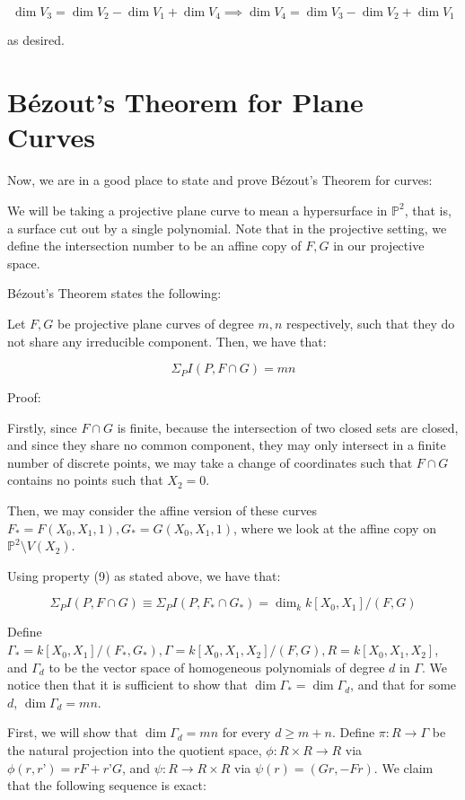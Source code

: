 \documentclass[10pt]{article}
\begin{document}
$$ \dim V_3 = \dim V_2 - \dim V_1 + \dim V_4 \implies \dim V_4 = \dim V_3 - \dim V_2 + \dim V_1$$

as desired.

\section{B\'ezout’s Theorem for Plane Curves}

Now, we are in a good place to state and prove B\'ezout’s Theorem for curves:

We will be taking a projective plane curve to mean a hypersurface in $\mathbb{P}^2$, that is, a surface cut out by a single polynomial. Note that in the projective setting, we define the intersection number to be an affine copy of $F,G$ in our projective space.

B\'ezout’s Theorem states the following:

Let $F, G$ be projective plane curves of degree $m,n$ respectively, such that they do not share any irreducible component. Then, we have that:

$$\Sigma_P I(P,F \cap G) = mn $$

Proof:

Firstly, since $F \cap G$ is finite, because the intersection of two closed sets are closed, and since they share no common component, they may only intersect in a finite number of discrete points, we may take a change of coordinates such that $F \cap G$  contains no points such that $X_2 = 0$.

Then, we may consider the affine version of these curves $F_* = F(X_0,X_1, 1), G_*= G(X_0,X_1, 1)$, where we look at the affine copy on $\mathbb{P}^2 \setminus V(X_2)$. 

Using property (9) as stated above, we have that:

$$\Sigma_P I(P,F \cap G) \equiv \Sigma_P I(P,F_* \cap G_*) = \dim_k k[X_0,X_1]/(F,G) $$

Define $\Gamma_* = k[X_0,X_1]/(F_*, G_*), \Gamma = k[X_0,X_1,X_2]/(F,G), R = k[X_0,X_1,X_2]$, and $\Gamma_d$ to be the vector space of homogeneous polynomials of degree $d$ in $\Gamma$. We notice then that it is sufficient to show that $\dim \Gamma_* = \dim \Gamma_d$, and that for some $d$, $\dim \Gamma_d = mn$.

First, we will show that $\dim \Gamma_d = mn$ for every $d \geq m+ n$. Define $\pi: R \to \Gamma$ be the natural projection into the quotient space, $\phi: R \times R \to R$ via $\phi(r,r’) = rF + r’G$, and $\psi: R \to R \times R$ via $\psi(r) = (Gr, -Fr)$. We claim that the following sequence is exact:
\end{document}
